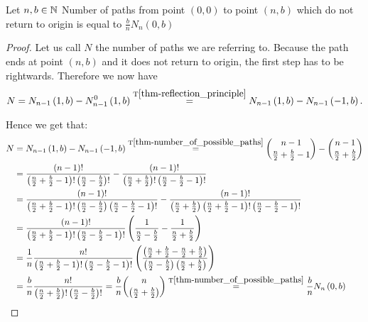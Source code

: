 \begin{thm}\label{thm-ballot_theorem}
 Let $n,b \in \mathbb{N}$
 Number of paths from point $ \left( 0,0 \right) $ to point $ \left( n,b \right) $ which do not return to origin is equal to $\frac{b}{n}N_n \left( 0,b \right) $
\end{thm}
\begin{proof}
 Let us call $N$ the number of paths we are referring to.
 Because the path ends at point $ \left( n,b \right) $ and it does not return to origin, the first step has to be rightwards. Therefore we now have
 \[
    N=N_{n-1} \left( 1,b \right) -N_{n-1}^0 \left( 1,b \right) \overset{\text{T}\ref{thm-reflection_principle}}{=}N_{n-1} \left( 1,b \right) -N_{n-1} \left( -1,b \right).
\]


 Hence we get that:
 \[
 \begin{split}
 N & = N_{n-1} \left( 1,b \right) -N_{n-1} \left( -1,b \right)
 \overset{\text{T}\ref{thm-number_of_possible_paths}}{=} \binom{n-1}{\frac{n}{2}+\frac{b}{2}-1}-\binom{n-1}{\frac{n}{2}+\frac{b}{2}}\\
 & =\frac{ \left( n-1 \right) !}{ \left( \frac{n}{2}+\frac{b}{2}-1 \right) ! \left( \frac{n}{2}-\frac{b}{2} \right) !}-\frac{ \left( n-1 \right) !}{ \left( \frac{n}{2}+\frac{b}{2} \right) ! \left( \frac{n}{2}-\frac{b}{2}-1 \right) !}\\
 & =\frac{ \left( n-1 \right) !}{ \left( \frac{n}{2}+\frac{b}{2}-1 \right) ! \left( \frac{n}{2}-\frac{b}{2} \right) \left( \frac{n}{2}-\frac{b}{2}-1 \right) !}-\frac{ \left( n-1 \right) !}{ \left( \frac{n}{2}+\frac{b}{2} \right) \left( \frac{n}{2}+\frac{b}{2}-1 \right) ! \left( \frac{n}{2}-\frac{b}{2}-1 \right) !}\\
 & =\frac{ \left( n-1 \right) !}{ \left( \frac{n}{2}+\frac{b}{2}-1 \right) ! \left( \frac{n}{2}-\frac{b}{2}-1 \right) !} \left( \frac{1}{\frac{n}{2}-\frac{b}{2}}-\frac{1}{\frac{n}{2}+\frac{b}{2}} \right) \\
 & =\frac{1}{n}\frac{n!}{ \left( \frac{n}{2}+\frac{b}{2}-1 \right) ! \left( \frac{n}{2}-\frac{b}{2}-1 \right) !} \left( \frac{ \left( \frac{n}{2}+\frac{b}{2}-\frac{n}{2}+\frac{b}{2} \right) }{ \left( \frac{n}{2}-\frac{b}{2} \right) \left( \frac{n}{2}+\frac{b}{2} \right)} \right)\\
 & =\frac{b}{n}\frac{n!}{ \left( \frac{n}{2}+\frac{b}{2} \right) ! \left( \frac{n}{2}-\frac{b}{2} \right) !}=\frac{b}{n}\binom{n}{ \left( \frac{n}{2}+\frac{b}{2} \right)}
 \overset{\text{T}\ref{thm-number_of_possible_paths}}{=} \frac{b}{n}N_n \left( 0,b \right)
\end{split}
 \]
\end{proof}
